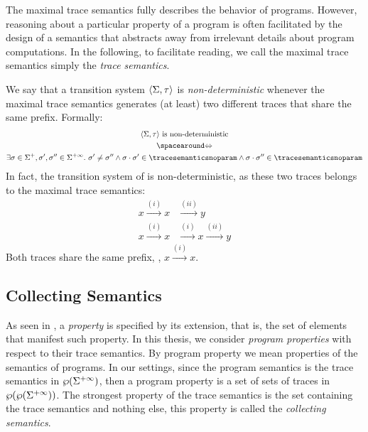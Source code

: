 The maximal trace semantics fully describes the behavior of programs. However, reasoning about a particular property of a program is often facilitated by the design of a semantics that abstracts away from irrelevant details about program computations.
In the following, to facilitate reading, we call the maximal trace semantics simply the \emph{trace semantics}.

\begin{remark}
  We say that a transition system $\langle \Sigma, \tau \rangle$ is \emph{non-deterministic} whenever the maximal trace semantics generates (at least) two different traces that share the same prefix. Formally:
  \begin{gather*}
    \transitionsystem \text{ is non-deterministic} \\ \IfF \\ \exists \deftrace \in \finitesequences, \deftrace', \deftrace'' \in \finiteinfinitesequences.\spacer \deftrace' \neq \deftrace'' \land \concat{\deftrace}{\deftrace'} \in \tracesemanticsnoparam \land \concat{\deftrace}{\deftrace''} \in \tracesemanticsnoparam
  \end{gather*}
  In fact, the transition system of  is non-deterministic, as these two traces belongs to the maximal trace semantics:
  \begin{align*}
    x \xrightarrow{(i)} x &\xrightarrow{(ii)} y\\
    x \xrightarrow{(i)} x &\xrightarrow{(i)} x \xrightarrow{(ii)} y
  \end{align*}
  Both traces share the same prefix, \ie, $x \xrightarrow{(i)} x$.
\end{remark}

\subsection{Collecting Semantics}

As seen in , a \emph{property} is specified by its extension, that is, the set of elements that manifest such property.
In this thesis, we consider \emph{program properties} with respect to their trace semantics.
By program property we mean properties of the semantics of programs.
In our settings, since the program semantics is the trace semantics in $\wp(\Sigma^{+\infty})$, then a program property is a set of sets of traces in $\wp(\wp(\Sigma^{+\infty}))$.
The strongest property of the trace semantics is the set containing the trace semantics and nothing else, this property is called the \emph{collecting semantics}.

